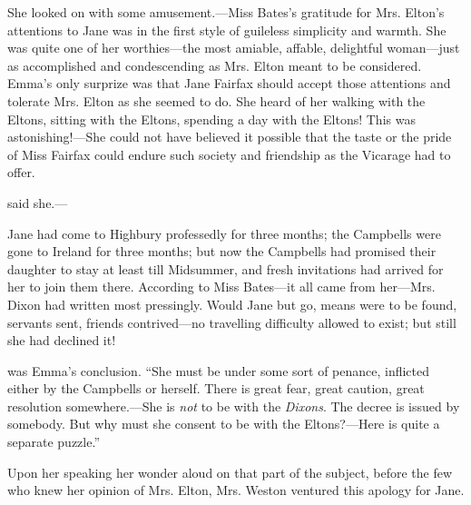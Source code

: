 She looked on with some amusement.---Miss Bates's gratitude for Mrs. Elton's attentions to Jane was in the first style of guileless simplicity and warmth. She was quite one of her worthies---the most amiable, affable, delightful woman---just as accomplished and condescending as Mrs. Elton meant to be considered. Emma's only surprize was that Jane Fairfax should accept those attentions and tolerate Mrs. Elton as she seemed to do. She heard of her walking with the Eltons, sitting with the Eltons, spending a day with the Eltons! This was astonishing!---She could not have believed it possible that the taste or the pride of Miss Fairfax could endure such society and friendship as the Vicarage had to offer.

 said she.---

Jane had come to Highbury professedly for three months; the Campbells were gone to Ireland for three months; but now the Campbells had promised their daughter to stay at least till Midsummer, and fresh invitations had arrived for her to join them there. According to Miss Bates---it all came from her---Mrs. Dixon had written most pressingly. Would Jane but go, means were to be found, servants sent, friends contrived---no travelling difficulty allowed to exist; but still she had declined it!

 was Emma's conclusion. “She must be under some sort of penance, inflicted either by the Campbells or herself. There is great fear, great caution, great resolution somewhere.---She is {\em not} to be with the {\em Dixons}. The decree is issued by somebody. But why must she consent to be with the Eltons?---Here is quite a separate puzzle.”

Upon her speaking her wonder aloud on that part of the subject, before the few who knew her opinion of Mrs. Elton, Mrs. Weston ventured this apology for Jane.



